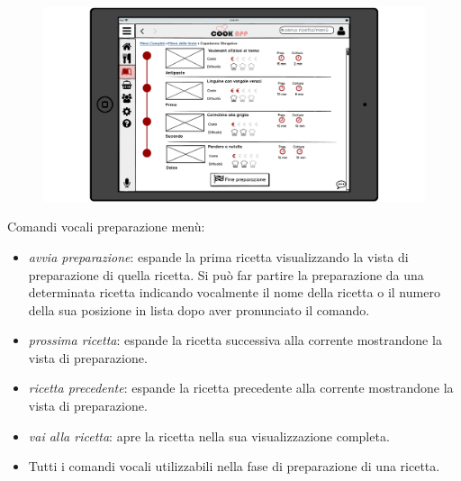 \begin{figure}[H]
	\centering
	\includegraphics[width=0.95\linewidth]{img/mockup/menu-preparazione-3.png}
\end{figure}
Comandi vocali preparazione menù:
\begin{itemize}:
\item \emph{avvia preparazione}: espande la prima ricetta visualizzando la
vista di preparazione di quella ricetta. Si può far partire la
preparazione da una determinata ricetta indicando vocalmente il nome della ricetta
o il numero della sua posizione in lista dopo aver pronunciato il
comando.
\item \emph{prossima ricetta}: espande la ricetta successiva alla corrente
mostrandone la vista di preparazione. 
\item \emph{ricetta precedente}: espande la ricetta precedente alla corrente
mostrandone la vista di preparazione.
\item \emph{vai alla ricetta}: apre la ricetta nella sua visualizzazione
completa.
\item Tutti i comandi vocali utilizzabili nella fase di preparazione di una
ricetta.

\end{itemize}
